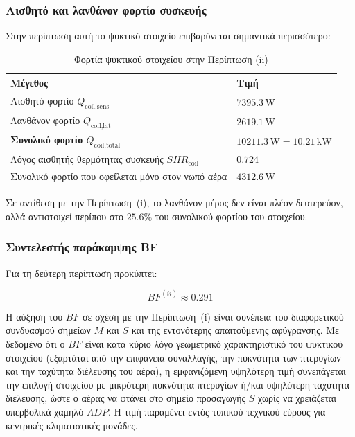 \documentclass[12pt,a4paper]{article}
\begin{document}
\subsubsection{Αισθητό και λανθάνον φορτίο συσκευής}

Στην περίπτωση αυτή το ψυκτικό στοιχείο επιβαρύνεται σημαντικά περισσότερο:

\begin{table}[H]
\centering
\caption{Φορτία ψυκτικού στοιχείου στην Περίπτωση (ii)}
\begin{tabularx}{\textwidth}{L C{4.3cm}}
\toprule
\textbf{Μέγεθος} & \textbf{Τιμή} \\
\midrule
Αισθητό φορτίο \(Q_{\text{coil,sens}}\) & \(7395.3\,\mathrm{W}\) \\
Λανθάνον φορτίο \(Q_{\text{coil,lat}}\) & \(2619.1\,\mathrm{W}\) \\
\textbf{Συνολικό φορτίο \(Q_{\text{coil,total}}\)} & \(\mathbf{10211.3\,\mathrm{W} = 10.21\,\mathrm{kW}}\) \\
Λόγος αισθητής θερμότητας συσκευής \(SHR_{\text{coil}}\) & \(0.724\) \\
\midrule
Συνολικό φορτίο που οφείλεται μόνο στον νωπό αέρα & \(4312.6\,\mathrm{W}\) \\
\bottomrule
\end{tabularx}
\end{table}

Σε αντίθεση με την Περίπτωση~(i), το λανθάνον μέρος δεν είναι πλέον δευτερεύον,
αλλά αντιστοιχεί περίπου στο \(25.6\%\) του συνολικού φορτίου του στοιχείου.

\subsubsection{Συντελεστής παράκαμψης BF}

Για τη δεύτερη περίπτωση προκύπτει:

\[
BF^{(ii)} \approx 0.291
\]

Η αύξηση του \(BF\) σε σχέση με την Περίπτωση~(i) είναι συνέπεια του διαφορετικού
συνδυασμού σημείων \(M\) και \(S\) και της εντονότερης απαιτούμενης αφύγρανσης.
Με δεδομένο ότι ο \(BF\) είναι κατά κύριο λόγο γεωμετρικό χαρακτηριστικό του
ψυκτικού στοιχείου (εξαρτάται από την επιφάνεια συναλλαγής, την πυκνότητα των
πτερυγίων και την ταχύτητα διέλευσης του αέρα), η εμφανιζόμενη υψηλότερη τιμή
συνεπάγεται την επιλογή στοιχείου με μικρότερη πυκνότητα πτερυγίων ή/και υψηλότερη
ταχύτητα διέλευσης, ώστε ο αέρας να φτάνει στο σημείο προσαγωγής \(S\) χωρίς να
χρειάζεται υπερβολικά χαμηλό \(ADP\). Η τιμή παραμένει εντός τυπικού τεχνικού
εύρους για κεντρικές κλιματιστικές μονάδες.
\end{document}
